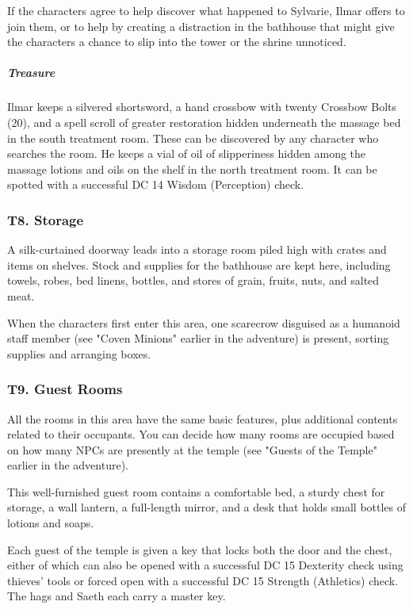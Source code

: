 \documentclass[10pt,a4paper,twoside,bg=print,twocolumn,openany,nodeprecatedcode]{dndbook}
\begin{document}
If the characters agree to help discover what happened to Sylvarie, Ilmar offers to join them, or to help by creating a distraction in the bathhouse that might give the characters a chance to slip into the tower or the shrine unnoticed.

\subparagraph{Treasure}
Ilmar keeps a silvered shortsword, a hand crossbow with twenty Crossbow Bolts (20), and a spell scroll of greater restoration hidden underneath the massage bed in the south treatment room. These can be discovered by any character who searches the room. He keeps a vial of oil of slipperiness hidden among the massage lotions and oils on the shelf in the north treatment room. It can be spotted with a successful DC 14 Wisdom (Perception) check.

\subsubsection{T8. Storage}
A silk-curtained doorway leads into a storage room piled high with crates and items on shelves. Stock and supplies for the bathhouse are kept here, including towels, robes, bed linens, bottles, and stores of grain, fruits, nuts, and salted meat.

When the characters first enter this area, one scarecrow disguised as a humanoid staff member (see "Coven Minions" earlier in the adventure) is present, sorting supplies and arranging boxes.

\subsubsection{T9. Guest Rooms}
All the rooms in this area have the same basic features, plus additional contents related to their occupants. You can decide how many rooms are occupied based on how many NPCs are presently at the temple (see "Guests of the Temple" earlier in the adventure).

\begin{DndReadAloud}{}
This well-furnished guest room contains a comfortable bed, a sturdy chest for storage, a wall lantern, a full-length mirror, and a desk that holds small bottles of lotions and soaps.

\end{DndReadAloud}

Each guest of the temple is given a key that locks both the door and the chest, either of which can also be opened with a successful DC 15 Dexterity check using thieves' tools or forced open with a successful DC 15 Strength (Athletics) check. The hags and Saeth each carry a master key.
\end{document}
